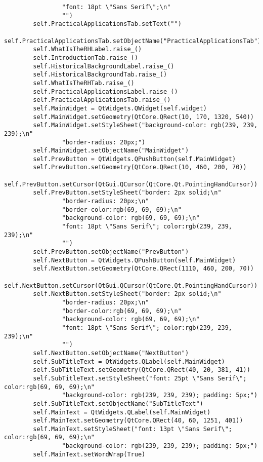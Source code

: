 \documentclass{article}
\begin{document}
\begin{lstlisting}
                "font: 18pt \"Sans Serif\";\n"
                "")
        self.PracticalApplicationsTab.setText("")
        self.PracticalApplicationsTab.setObjectName("PracticalApplicationsTab")
        self.WhatIsTheRHLabel.raise_()
        self.IntroductionTab.raise_()
        self.HistoricalBackgroundLabel.raise_()
        self.HistoricalBackgroundTab.raise_()
        self.WhatIsTheRHTab.raise_()
        self.PracticalApplicationsLabel.raise_()
        self.PracticalApplicationsTab.raise_()
        self.MainWidget = QtWidgets.QWidget(self.widget)
        self.MainWidget.setGeometry(QtCore.QRect(10, 170, 1320, 540))
        self.MainWidget.setStyleSheet("background-color: rgb(239, 239, 239);\n"
                "border-radius: 20px;")
        self.MainWidget.setObjectName("MainWidget")
        self.PrevButton = QtWidgets.QPushButton(self.MainWidget)
        self.PrevButton.setGeometry(QtCore.QRect(10, 460, 200, 70))
        self.PrevButton.setCursor(QtGui.QCursor(QtCore.Qt.PointingHandCursor))
        self.PrevButton.setStyleSheet("border: 2px solid;\n"
                "border-radius: 20px;\n"
                "border-color:rgb(69, 69, 69);\n"
                "background-color: rgb(69, 69, 69);\n"
                "font: 18pt \"Sans Serif\"; color:rgb(239, 239, 239);\n"
                "")
        self.PrevButton.setObjectName("PrevButton")
        self.NextButton = QtWidgets.QPushButton(self.MainWidget)
        self.NextButton.setGeometry(QtCore.QRect(1110, 460, 200, 70))
        self.NextButton.setCursor(QtGui.QCursor(QtCore.Qt.PointingHandCursor))
        self.NextButton.setStyleSheet("border: 2px solid;\n"
                "border-radius: 20px;\n"
                "border-color:rgb(69, 69, 69);\n"
                "background-color: rgb(69, 69, 69);\n"
                "font: 18pt \"Sans Serif\"; color:rgb(239, 239, 239);\n"
                "")
        self.NextButton.setObjectName("NextButton")
        self.SubTitleText = QtWidgets.QLabel(self.MainWidget)
        self.SubTitleText.setGeometry(QtCore.QRect(40, 20, 381, 41))
        self.SubTitleText.setStyleSheet("font: 25pt \"Sans Serif\"; color:rgb(69, 69, 69);\n"
                "background-color: rgb(239, 239, 239); padding: 5px;")
        self.SubTitleText.setObjectName("SubTitleText")
        self.MainText = QtWidgets.QLabel(self.MainWidget)
        self.MainText.setGeometry(QtCore.QRect(40, 60, 1251, 401))
        self.MainText.setStyleSheet("font: 13pt \"Sans Serif\"; color:rgb(69, 69, 69);\n"
                "background-color: rgb(239, 239, 239); padding: 5px;")
        self.MainText.setWordWrap(True)

\end{lstlisting}
\end{document}
